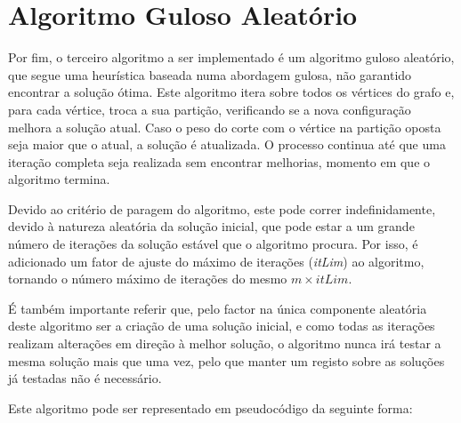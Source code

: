 \documentclass[mirror, portugues]{revdetua}
\begin{document}
\section{Algoritmo Guloso Aleatório}

Por fim, o terceiro algoritmo a ser implementado é um algoritmo guloso aleatório, que segue uma heurística baseada numa abordagem gulosa, não garantido encontrar a solução ótima. Este algoritmo itera sobre todos os vértices do grafo e, para cada vértice, troca a sua partição, verificando se a nova configuração melhora a solução atual. Caso o peso do corte com o vértice na partição oposta seja maior que o atual, a solução é atualizada. O processo continua até que uma iteração completa seja realizada sem encontrar melhorias, momento em que o algoritmo termina.

Devido ao critério de paragem do algoritmo, este pode correr indefinidamente, devido à natureza aleatória da solução inicial, que pode estar a um grande número de iterações da solução estável que o algoritmo procura. Por isso, é adicionado um fator de ajuste do máximo de iterações (\textit{itLim}) ao algoritmo, tornando o número máximo de iterações do mesmo $m \times itLim$.

É também importante referir que, pelo factor na única componente aleatória deste algoritmo ser a criação de uma solução inicial, e como todas as iterações realizam alterações em direção à melhor solução, o algoritmo nunca irá testar a mesma solução mais que uma vez, pelo que manter um registo sobre as soluções já testadas não é necessário.

Este algoritmo pode ser representado em pseudocódigo da seguinte forma:
\end{document}
